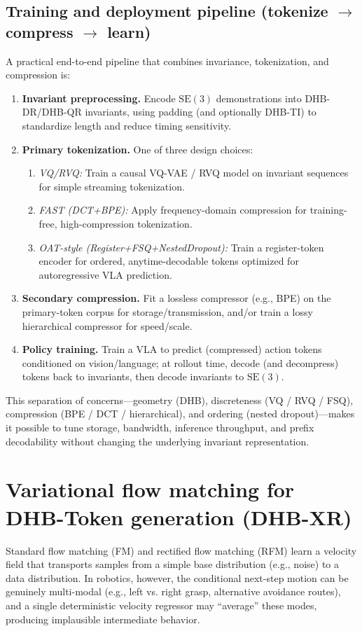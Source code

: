 \documentclass[11pt]{article}
\begin{document}
\subsection{Training and deployment pipeline (tokenize $\to$ compress $\to$ learn)}
A practical end-to-end pipeline that combines invariance, tokenization, and compression is:
\begin{enumerate}
  \item \textbf{Invariant preprocessing.} Encode $\mathrm{SE}(3)$ demonstrations into DHB-DR/DHB-QR invariants, using padding (and optionally DHB-TI) to standardize length and reduce timing sensitivity.
  \item \textbf{Primary tokenization.} One of three design choices:
    \begin{enumerate}
      \item \emph{VQ/RVQ:} Train a causal VQ-VAE / RVQ model on invariant sequences for simple streaming tokenization.
      \item \emph{FAST (DCT+BPE):} Apply frequency-domain compression for training-free, high-compression tokenization.
      \item \emph{OAT-style (Register+FSQ+NestedDropout):} Train a register-token encoder for ordered, anytime-decodable tokens optimized for autoregressive VLA prediction.
    \end{enumerate}
  \item \textbf{Secondary compression.} Fit a lossless compressor (e.g., BPE) on the primary-token corpus for storage/transmission, and/or train a lossy hierarchical compressor for speed/scale.
  \item \textbf{Policy training.} Train a VLA to predict (compressed) action tokens conditioned on vision/language; at rollout time, decode (and decompress) tokens back to invariants, then decode invariants to $\mathrm{SE}(3)$.
\end{enumerate}

This separation of concerns---geometry (DHB), discreteness (VQ / RVQ / FSQ), compression (BPE / DCT / hierarchical), and ordering (nested dropout)---makes it possible to tune storage, bandwidth, inference throughput, and prefix decodability without changing the underlying invariant representation.

\section{Variational flow matching for DHB-Token generation (DHB-XR)}
Standard flow matching (FM) and rectified flow matching (RFM) learn a velocity field that transports samples from a simple base distribution (e.g., noise) to a data distribution. In robotics, however, the conditional next-step motion can be genuinely multi-modal (e.g., left vs. right grasp, alternative avoidance routes), and a single deterministic velocity regressor may ``average'' these modes, producing implausible intermediate behavior.
\end{document}
